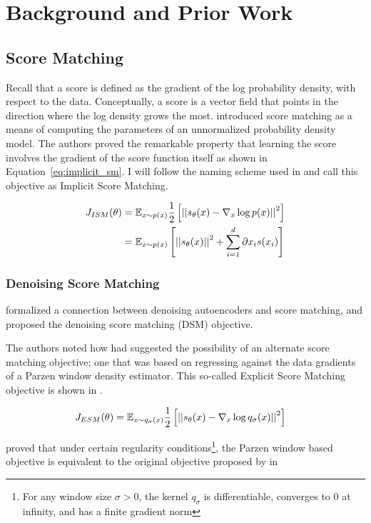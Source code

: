 \chapter{Background and Prior Work}

\section{Score Matching}
Recall that a score is defined as the gradient of the log probability density, with respect to the data. Conceptually, a score is a vector field that points in the direction where the log density grows the most. 
\cite{hyvarinen2005} introduced score matching as a means of computing the parameters of an unnormalized probability density model. The authors proved the remarkable property that learning the score involves the gradient of the score function itself as shown in Equation~\ref{eq:implicit_sm}. I will follow the naming scheme used in \cite{vincent2011connection} and call this objective as Implicit Score Matching.

\begin{align}
\label{eq:implicit_sm}
    J_{ISM}(\theta) &= \mathbb{E}_{x \sim p(x)} \frac{1}{2} \left[ { \left|\left| {s_\theta(x) - \nabla_x \log p(x) } \right|\right|^2 } \right] \\
    &= \mathbb{E}_{x \sim p(x)} \left[ { \left|\left| {s_\theta(x)} \right|\right|^2 + \sum^{d}_{i=1}{\partial{x_{i}} s(x_{i}) } } \right]
\end{align}


\subsection*{Denoising Score Matching}

\cite{vincent2011connection} formalized a connection between denoising autoencoders and score matching, and proposed the denoising score matching (DSM) objective.

The authors noted how \cite{hyvarinen2005} had suggested the possibility of an alternate score matching objective; one that was based on regressing against the data gradients of a Parzen window density estimator. This so-called Explicit Score Matching objective is shown in .

\begin{align}
\label{eq:explicit_sm}
    J_{ESM}(\theta) &= \mathbb{E}_{x \sim q_{\sigma}(x)} \frac{1}{2} \left[ { \left|\left| {s_\theta(x) - \nabla_x \log q_{\sigma}(x) } \right|\right|^2 } \right]
\end{align}

\cite{vincent2011connection} proved that under certain regularity conditions\footnote{For any window size $\sigma > 0$, the kernel $q_{\sigma}$ is differentiable, converges to 0 at infinity, and has a finite gradient norm},
the Parzen window based objective is equivalent to the original objective proposed by \cite{hyvarinen2005} in 


